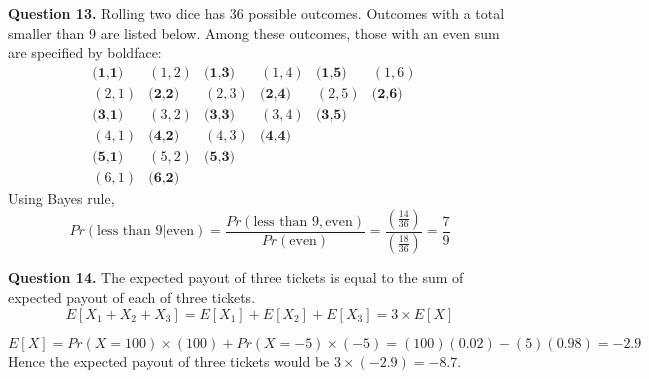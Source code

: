 \documentclass{ximera}
\begin{document}
\textbf{Question 13.} Rolling two dice has 36 possible outcomes. Outcomes with a total smaller than 9 are listed below. Among these outcomes, those with an even sum are specified by boldface:
\begin{equation*}
\begin{matrix}
\textbf{(1,1)} & (1,2) & \textbf{(1,3)} & (1,4) & \textbf{(1,5)} & (1,6) \\
(2,1) & \textbf{(2,2)} & (2,3) & \textbf{(2,4)} & (2,5) & \textbf{(2,6)} \\
\textbf{(3,1)} & (3,2) & \textbf{(3,3)} & (3,4) & \textbf{(3,5)} && \\
(4,1) & \textbf{(4,2)} & (4,3) & \textbf{(4,4)} &&& \\
\textbf{(5,1)} & (5,2) & \textbf{(5,3)} &&&& \\
(6,1) & \textbf{(6,2)}
\end{matrix}
\end{equation*}
Using Bayes rule,
\begin{equation*}
Pr (\text{less than 9} | \text{even}) = \frac{Pr(\text{less than 9}, \text{even})}{Pr(\text{even})} = \frac{(\frac{14}{36})}{(\frac{18}{36})} = \frac{7}{9}
\end{equation*}

\textbf{Question 14.} The expected payout of three tickets is equal to the sum of expected payout of each of three tickets. 
\begin{equation*}
E[X_1 + X_2 + X_3] = E[X_1] + E[X_2] + E[X_3] = 3 \times E[X]
\end{equation*}

\begin{equation*}
E[X] = Pr(X = 100) \times (100) + Pr(X = -5) \times (-5) = (100)(0.02)-(5)(0.98) = -2.9
\end{equation*}
Hence the expected payout of three tickets would be $3 \times (-2.9) = -8.7$.
\end{document}
